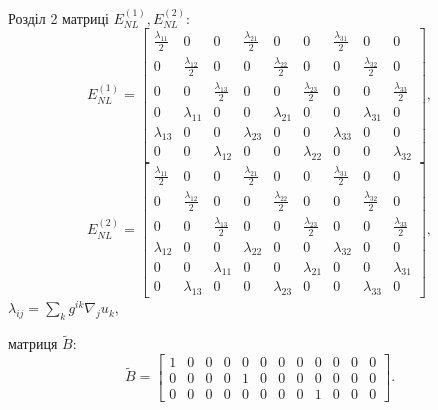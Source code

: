 \documentclass[8pt]{beamer}
\numberwithin{figure}{section}
\numberwithin{equation}{section}
\numberwithin{table}{section}
\begin{document}
\begin{frame}{Розділ 2}
матриці $E_{NL}^{(1)}, E_{NL}^{(2)}$:
\begin{equation}
E_{NL}^{(1)}=\left[\begin{matrix}
\frac{\lambda_{11}}{2} & 0 & 0 & \frac{\lambda_{21}}{2} & 0 & 0 & \frac{\lambda_{31}}{2} & 0 & 0\\
0 & \frac{\lambda_{12}}{2} & 0 & 0 & \frac{\lambda_{22}}{2} & 0 & 0 & \frac{\lambda_{32}}{2} & 0\\
0 & 0 & \frac{\lambda_{13}}{2} & 0 & 0 & \frac{\lambda_{23}}{2} & 0 & 0 & \frac{\lambda_{33}}{2}\\
0 & \lambda_{11} & 0 & 0 & \lambda_{21} & 0 & 0 & \lambda_{31} & 0\\
\lambda_{13} & 0 & 0 & \lambda_{23} & 0 & 0 & \lambda_{33} & 0 & 0\\
0 & 0 & \lambda_{12} & 0 & 0 & \lambda_{22} & 0 & 0 & \lambda_{32}
\end{matrix}\right],
\end{equation}
\begin{equation}
E_{NL}^{(2)}=\left[\begin{matrix}
\frac{\lambda_{11}}{2} & 0 & 0 & \frac{\lambda_{21}}{2} & 0 & 0 & \frac{\lambda_{31}}{2} & 0 & 0\\
0 & \frac{\lambda_{12}}{2} & 0 & 0 & \frac{\lambda_{22}}{2} & 0 & 0 & \frac{\lambda_{32}}{2} & 0\\
0 & 0 & \frac{\lambda_{13}}{2} & 0 & 0 & \frac{\lambda_{23}}{2} & 0 & 0 & \frac{\lambda_{33}}{2}\\
\lambda_{12} & 0 & 0 & \lambda_{22} & 0 & 0 & \lambda_{32} & 0 & 0\\
0 & 0 & \lambda_{11} & 0 & 0 & \lambda_{21} & 0 & 0 & \lambda_{31}\\
0 & \lambda_{13} & 0 & 0 & \lambda_{23} & 0 & 0 & \lambda_{33} & 0
\end{matrix}\right],
\end{equation}
$ \lambda_{ij}=\sum_k g^{ik}\nabla_j u_k $,

матриця $\tilde{B}$:
\begin{equation}
\tilde{B}=
\left[\begin{array}{cccccccccccc}
1 & 0 & 0 & 0 & 0 & 0 & 0 & 0 & 0 & 0 & 0 & 0\\
0 & 0 & 0 & 0 & 1 & 0 & 0 & 0 & 0 & 0 & 0 & 0\\
0 & 0 & 0 & 0 & 0 & 0 & 0 & 0 & 1 & 0 & 0 & 0
\end{array}\right].
\end{equation}


\end{frame}
\end{document}
